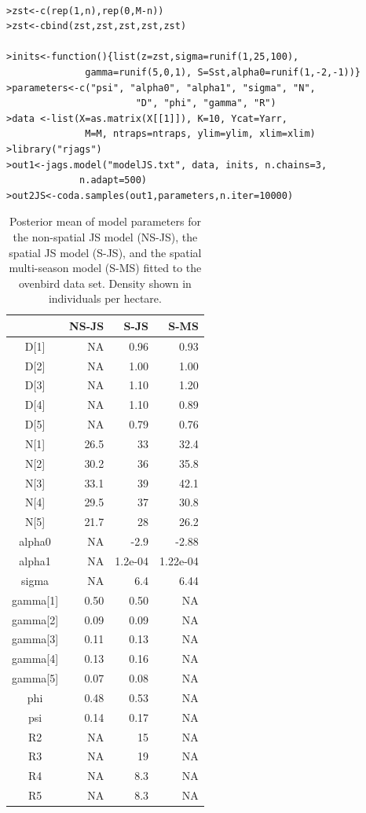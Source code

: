 \begin{verbatim}

>zst<-c(rep(1,n),rep(0,M-n))
>zst<-cbind(zst,zst,zst,zst,zst)

>inits<-function(){list(z=zst,sigma=runif(1,25,100), 
              gamma=runif(5,0,1), S=Sst,alpha0=runif(1,-2,-1))}
>parameters<-c("psi", "alpha0", "alpha1", "sigma", "N",
                       "D", "phi", "gamma", "R")
>data <-list(X=as.matrix(X[[1]]), K=10, Ycat=Yarr,
              M=M, ntraps=ntraps, ylim=ylim, xlim=xlim)
>library("rjags")
>out1<-jags.model("modelJS.txt", data, inits, n.chains=3, 
             n.adapt=500)
>out2JS<-coda.samples(out1,parameters,n.iter=10000)

\end{verbatim}



\begin{table}
\centering
\caption{
Posterior mean of model parameters for the non-spatial JS model (NS-JS), the spatial JS model (S-JS),
and the spatial multi-season model (S-MS) fitted to the
ovenbird data set.  Density shown in individuals per hectare. 
}

\begin{tabular}{crrr}
\hline \hline
    &   NS-JS &   S-JS   &   S-MS \\  \hline
D[1]    &  NA & 0.96 &  0.93   \\
D[2]     & NA & 1.00 &  1.00  \\
D[3]   &   NA & 1.10 &  1.20  \\
D[4]   &   NA & 1.10 &  0.89 \\
D[5]   &   NA & 0.79  & 0.76  \\
N[1]   &  26.5 &  33 &  32.4  \\
N[2]   &  30.2 &  36 &  35.8  \\
N[3]    & 33.1 &  39 &  42.1 \\
N[4]   &  29.5 &  37 &  30.8 \\
N[5]   &   21.7 & 28 &  26.2 \\
alpha0 &   NA & -2.9 & -2.88  \\
alpha1  &   NA & 1.2e-04 & 1.22e-04  \\
sigma  &   NA &  6.4 & 6.44 \\
gamma[1]  & 0.50 &  0.50 & NA \\
gamma[2] &  0.09  & 0.09 & NA \\
gamma[3] &  0.11 & 0.13 & NA \\
gamma[4] &  0.13 & 0.16 & NA \\
gamma[5] &  0.07 & 0.08 & NA \\
phi   &  0.48 &   0.53 & NA \\
psi   &  0.14 &  0.17 & NA \\
R2    &  NA &   15 & NA \\
R3    &   NA &   19 & NA \\
R4    &   NA &   8.3 & NA \\  %
R5    &   NA &   8.3 & NA \\ \hline
\end{tabular}
\label{open.tab.JSmulti}
\end{table}

